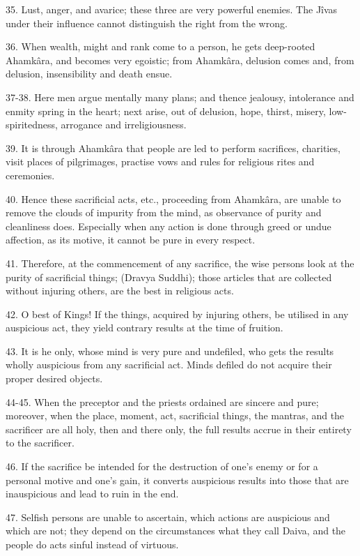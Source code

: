 35. Lust, anger, and avarice; these three are very powerful enemies. The J\^ivas under their influence cannot distinguish the right from the wrong.

36. When wealth, might and rank come to a person, he gets deep-rooted Ahamk\^ara, and becomes very egoistic; from Ahamk\^ara, delusion comes and, from delusion, insensibility and death ensue.

37-38. Here men argue mentally many plans; and thence jealousy, intolerance and enmity spring in the heart; next arise, out of delusion, hope, thirst, misery, low-spiritedness, arrogance and irreligiousness.

39. It is through Ahamk\^ara that people are led to perform sacrifices, charities, visit places of pilgrimages, practise vows and rules for religious rites and ceremonies.

40. Hence these sacrificial acts, etc., proceeding from Ahamk\^ara, are unable to remove the clouds of impurity from the mind, as observance of purity and cleanliness does. Especially when any action is done through greed or undue affection, as its motive, it cannot be pure in every respect.

41. Therefore, at the commencement of any sacrifice, the wise persons look at the purity of sacrificial things; (Dravya Suddhi); those articles that are collected without injuring others, are the best in religious acts.

42. O best of Kings! If the things, acquired by injuring others, be utilised in any auspicious act, they yield contrary results at the time of fruition.

43. It is he only, whose mind is very pure and undefiled, who gets the results wholly auspicious from any sacrificial act. Minds defiled do not acquire their proper desired objects.

44-45. When the preceptor and the priests ordained are sincere and pure; moreover, when the place, moment, act, sacrificial things, the mantras, and the sacrificer are all holy, then and there only, the full results accrue in their entirety to the sacrificer.

46. If the sacrifice be intended for the destruction of one's enemy or for a personal motive and one's gain, it converts auspicious results into those that are inauspicious and lead to ruin in the end.

47. Selfish persons are unable to ascertain, which actions are auspicious and which are not; they depend on the circumstances what they call Daiva, and the people do acts sinful instead of virtuous.

